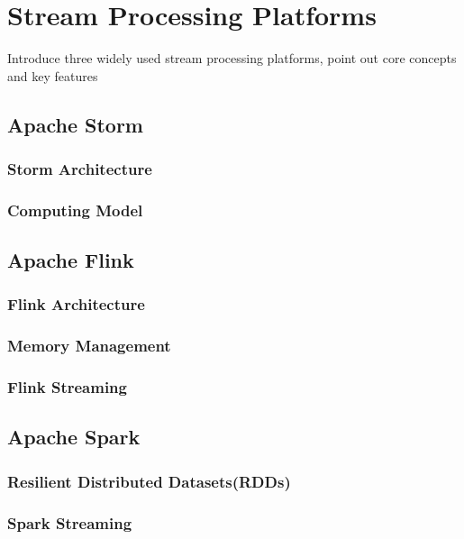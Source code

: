 \section{Stream Processing Platforms}
Introduce three widely used stream processing platforms, point out core concepts and key features 

\subsection{Apache Storm}
\subsubsection{Storm Architecture}
\subsubsection{Computing Model}

\subsection{Apache Flink}
\subsubsection{Flink Architecture}
\subsubsection{Memory Management}
\subsubsection{Flink Streaming}


\subsection{Apache Spark}
\subsubsection{ Resilient Distributed Datasets(RDDs)}
\subsubsection{Spark Streaming}


\clearpage